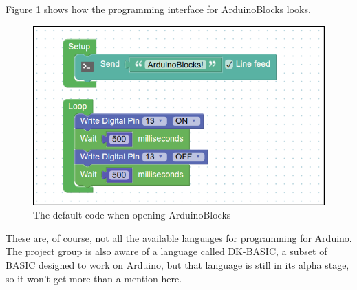 Figure \ref{fig:arduinoBlocks} shows how the programming interface for ArduinoBlocks looks.

\begin{figure}[H]
	\centering
	\includegraphics[width=\textwidth/2+\textwidth/4]{2.Analysis/images/ArduinoBlocks.png}
	\caption{The default code when opening ArduinoBlocks}
	\label{fig:arduinoBlocks}
\end{figure}

These are, of course, not all the available languages for programming for Arduino.
The project group is also aware of a language called DK-BASIC, a subset of BASIC designed to work on Arduino, but that language is still in its alpha stage, so it won't get more than a mention here.
